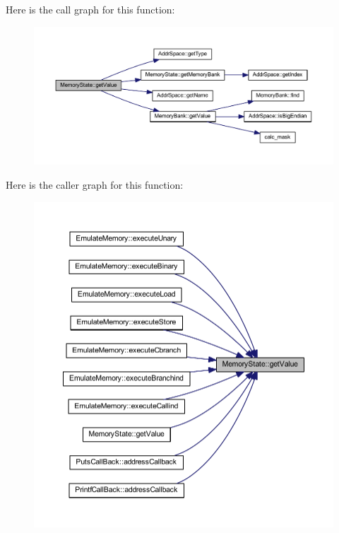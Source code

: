 Here is the call graph for this function\+:
\nopagebreak
\begin{figure}[H]
\begin{center}
\leavevmode
\includegraphics[width=350pt]{class_memory_state_ae4d10a6ac34ebd96017915c5b6a39375_cgraph}
\end{center}
\end{figure}
Here is the caller graph for this function\+:
\nopagebreak
\begin{figure}[H]
\begin{center}
\leavevmode
\includegraphics[width=350pt]{class_memory_state_ae4d10a6ac34ebd96017915c5b6a39375_icgraph}
\end{center}
\end{figure}
\mbox{\label{class_memory_state_af9ec8f86ed75b9b2f57c3351951ce5b1}} 
